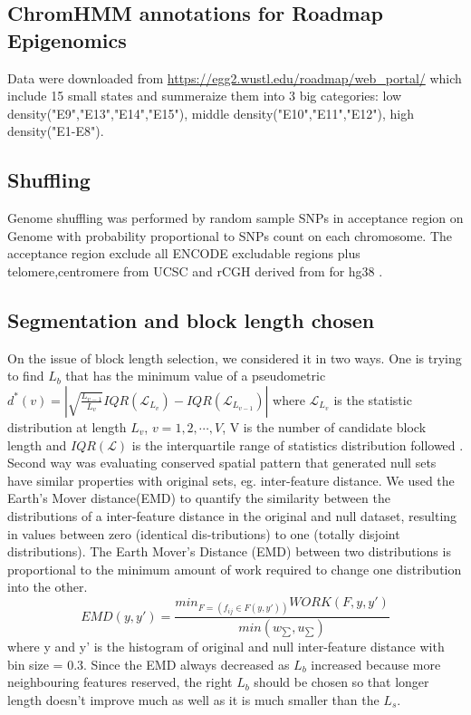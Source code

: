 \documentclass{article}
\begin{document}
\subsection{ChromHMM annotations for Roadmap Epigenomics}
Data were downloaded from \url{https://egg2.wustl.edu/roadmap/web_portal/} which include 15 small states and summeraize them into 3 big categories: low density("E9","E13","E14","E15"), middle density("E10","E11","E12"), high density("E1-E8"). 

\subsection{Shuffling}\label{sec:shuffle}
Genome shuffling was performed by random sample SNPs in acceptance region on Genome with probability proportional to SNPs count on each chromosome. The acceptance region exclude all ENCODE excludable regions plus telomere,centromere from UCSC and rCGH derived from  for hg38 \citep{excluderanges}.

\subsection{Segmentation and block length chosen}\label{sec:length}
On the issue of 
block length selection, we considered it in two ways. One is trying to find $L_b$ that has the minimum value of a pseudometric $d^*(v)=|\sqrt{\frac{L_{v-1}}{L_v}}IQR(\mathcal{L}_{L_v})-IQR(\mathcal{L}_{L_{v-1}})|$ where $\mathcal{L}_{L_v}$ is the statistic distribution at length $L_v$, $v=1,2,\cdots,V$, V is the number of candidate block length and $IQR(\mathcal{L})$ is the interquartile range of statistics distribution followed \citet{bickel2010subsampling}.
Second way was evaluating conserved spatial pattern that generated null sets have similar properties with original sets, eg. inter-feature distance. We used the Earth's Mover distance(EMD) to quantify the similarity between the distributions of a inter-feature distance in the original  and  null  dataset,  resulting  in  values  between  zero  (identical  dis-tributions)  to  one  (totally  disjoint  distributions). The Earth Mover's Distance (EMD) between two distributions is proportional to the minimum amount of work required to change one distribution into the other. $$EMD(y,y') = \frac{min_{F=(f_{ij}\in \mathcal{}F(y,y'))} WORK(F,y,y')}{min(w_{\sum},u_{\sum})}$$ where y and y' is the histogram of original and null inter-feature distance with bin size = 0.3. Since the EMD always decreased as $L_b$ increased because more neighbouring features reserved, the right $L_b$ should be chosen so that longer length doesn’t improve much as well as it is much smaller than the $L_s$.
\end{document}
